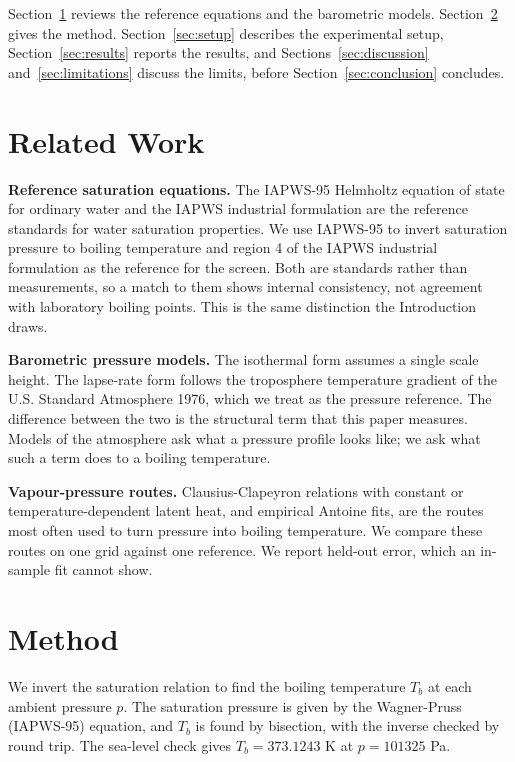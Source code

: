 \documentclass[11pt,letterpaper]{article}
\begin{document}
Section~\ref{sec:related} reviews the reference equations and the barometric models. Section~\ref{sec:method} gives the method. Section~\ref{sec:setup} describes the experimental setup, Section~\ref{sec:results} reports the results, and Sections~\ref{sec:discussion} and~\ref{sec:limitations} discuss the limits, before Section~\ref{sec:conclusion} concludes.

\section{Related Work}\label{sec:related}

\textbf{Reference saturation equations.} The IAPWS-95 Helmholtz equation of state for ordinary water and the IAPWS industrial formulation are the reference standards for water saturation properties. We use IAPWS-95 to invert saturation pressure to boiling temperature and region 4 of the IAPWS industrial formulation as the reference for the screen. Both are standards rather than measurements, so a match to them shows internal consistency, not agreement with laboratory boiling points. This is the same distinction the Introduction draws.

\textbf{Barometric pressure models.} The isothermal form assumes a single scale height. The lapse-rate form follows the troposphere temperature gradient of the U.S. Standard Atmosphere 1976, which we treat as the pressure reference. The difference between the two is the structural term that this paper measures. Models of the atmosphere ask what a pressure profile looks like; we ask what such a term does to a boiling temperature.

\textbf{Vapour-pressure routes.} Clausius-Clapeyron relations with constant or temperature-dependent latent heat, and empirical Antoine fits, are the routes most often used to turn pressure into boiling temperature. We compare these routes on one grid against one reference. We report held-out error, which an in-sample fit cannot show.

\section{Method}\label{sec:method}

We invert the saturation relation to find the boiling temperature $T_b$ at each ambient pressure $p$. The saturation pressure is given by the Wagner-Pruss (IAPWS-95) equation, and $T_b$ is found by bisection, with the inverse checked by round trip. The sea-level check gives $T_b = 373.1243$ K at $p = 101325$ Pa.
\end{document}
